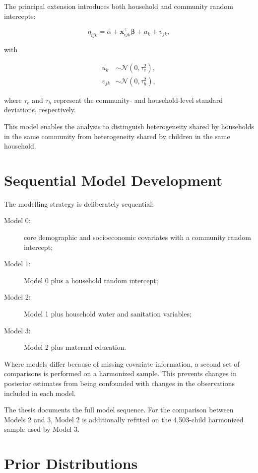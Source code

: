 The principal extension introduces both household and community random intercepts:

\begin{equation}
\eta_{ijk}
=
\alpha
+
\mathbf{x}_{ijk}^{\top}\boldsymbol{\beta}
+
u_k
+
v_{jk},
\end{equation}

with

\begin{align}
u_k &\sim \mathcal{N}(0,\tau_c^2), \\
v_{jk} &\sim \mathcal{N}(0,\tau_h^2),
\end{align}

where $\tau_c$ and $\tau_h$ represent the community- and household-level standard deviations, respectively.

This model enables the analysis to distinguish heterogeneity shared by households in the same community from heterogeneity shared by children in the same household.

\section{Sequential Model Development}

The modelling strategy is deliberately sequential:

\begin{description}
    \item[Model 0:] core demographic and socioeconomic covariates with a community random intercept;
    \item[Model 1:] Model 0 plus a household random intercept;
    \item[Model 2:] Model 1 plus household water and sanitation variables;
    \item[Model 3:] Model 2 plus maternal education.
\end{description}

Where models differ because of missing covariate information, a second set of comparisons is performed on a harmonized sample. This prevents changes in posterior estimates from being confounded with changes in the observations included in each model.

The thesis documents the full model sequence. For the comparison between Models 2 and 3, Model 2 is additionally refitted on the 4,503-child harmonized sample used by Model 3.

\section{Prior Distributions}

